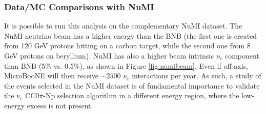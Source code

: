 \subsubsection{Data/MC Comparisons with NuMI}
It is possible to run this analysis on the complementary NuMI dataset. The NuMI neutrino beam has a higher energy than the BNB (the first one is created from 120 GeV protons hitting on a carbon target, while the second one from 8 GeV protons on beryllium). NuMI has also a higher beam intrinsic $\nu_{e}$ component than BNB (5\% vs. 0.5\%), as shown in Figure \ref{fig:numibeam}. Even if off-axis, MicroBooNE will then receive $\sim2500$ $\nu_{e}$ interactions per year. 
As such, a study of the events selected in the NuMI dataset is of fundamental importance to validate the $\nu_{e}$ CC0$\pi$-Np selection algorithm in a different energy region, where the low-energy excess is not present.

